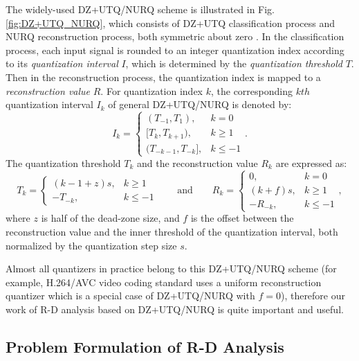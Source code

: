 \documentclass[smallabstract,smallcaptions]{dccpaper}
\begin{document}
The widely-used DZ+UTQ/NURQ scheme is illustrated in Fig. \ref{fig:DZ+UTQ_NURQ}, which consists of DZ+UTQ classification process and NURQ reconstruction process, both symmetric about zero \cite{Sullivan_VCIP2005}. In the classification process, each input signal is rounded to an integer quantization index according to its \emph{quantization interval} $I$, which is determined by the \emph{quantization threshold} $T$. Then in the reconstruction process, the quantization index is mapped to a \emph{reconstruction value} $R$. For quantization index $k$, the corresponding $kth$ quantization interval $I_{k}$ of general DZ+UTQ/NURQ is denoted by:
\begin{equation}
\label{equ:interval}
I_{k}=\left\{ \begin{array}{ll}
(T_{-1}, T_{1}),         & k = 0 \\
{[T_{k}, T_{k+1})},        & k \ge 1 \\
(T_{-k-1}, T_{-k}],      & k \le -1
\end{array}\right. .
\end{equation}
The quantization threshold $T_{k}$ and the reconstruction value $R_{k}$ are expressed as:
\begin{equation}
\label{equ:DZ+UTQ/NURQ}
T_{k}=\left\{ \begin{array}{ll}
(k-1+z)s, & k \ge 1 \\
-T_{-k},  & k \le -1
\end{array}\right.
\qquad \textrm{and} \qquad
R_{k}=\left\{ \begin{array}{ll}
0,        & k = 0 \\
(k+f)s,   & k \ge 1 \\
-R_{-k},  & k \le -1
\end{array}\right. ,
\end{equation}
where $z$ is half of the dead-zone size, and $f$ is the offset between the reconstruction value and the inner threshold of the quantization interval, both normalized by the quantization step size $s$.

Almost all quantizers in practice belong to this DZ+UTQ/NURQ scheme (for example, H.264/AVC video coding standard uses a uniform reconstruction quantizer which is a special case of DZ+UTQ/NURQ with $f=0$), therefore our work of R-D analysis based on DZ+UTQ/NURQ is quite important and useful.

\subsection{Problem Formulation of R-D Analysis}
\end{document}
